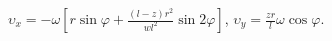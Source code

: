 $\upsilon _x =
-\omega[r\sin{\varphi} + \frac{(l - z)r^2}{wl^2}\sin{2\varphi}]$,
$\upsilon _y = \frac{zr}{l}\omega\cos{\varphi}$.
